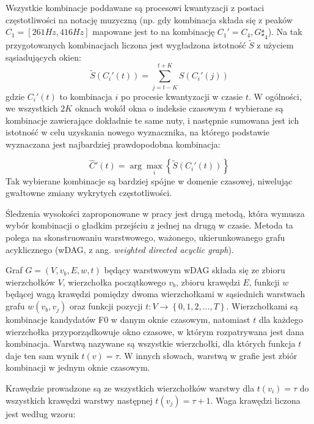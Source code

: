 \documentclass[12pt,a4paper,twoside]{mwart}
\begin{document}
Wszystkie kombinacje poddawane są procesowi kwantyzacji z postaci częstotliwości na notację muzyczną (np. gdy kombinacja składa się z peaków $C_1 = [261 Hz, 416 Hz]$ mapowane jest to na kombinację $C_1' = {C_4, G\sharp_4}$). Na tak przygotowanych kombinacjach liczona jest wygładzona istotność $\widetilde{S}$ z użyciem sąsiadujących okien:
\begin{equation} \label{eq:inharmonicity2:smoothedSalience}
  \widetilde{S}(C_i'(t)) = \sum_{j = t - K}^{t+K}S(C_i'(j))
\end{equation}
gdzie $C_i'(t)$ to kombinacja $i$ po procesie kwantyzacji w czasie $t$. W ogólności, we wszystkich $2K$ oknach wokół okna o indeksie czasowym $t$ wybierane są kombinacje zawierające dokładnie te same nuty, i następnie sumowana jest ich istotność w celu uzyskania nowego wyznacznika, na którego podstawie wyznaczana jest najbardziej prawdopodobna kombinacja:

\begin{equation} \label{eq:inharmonicity2:smoothedSalience:winner}
\widehat{C}'(t) = \arg \max_i \left\{\widetilde{S}(C_i'(t))\right\}
\end{equation}
Tak wybierane kombinacje są bardziej spójne w domenie czasowej, niwelując gwałtowne zmiany wykrytych częstotliwości.

Śledzenia wysokości zaproponowane w pracy 
\cite[7-8]{Transcription:Pertus:Inharmonicity2} 
jest drugą metodą, która wymusza wybór kombinacji o gładkim przejściu z jednej na drugą w czasie. Metoda ta polega na skonstruowaniu warstwowego, ważonego, ukierunkowanego grafu acyklicznego (wDAG, z ang. \textit{weighted directed acyclic graph}).

Graf $G = \left(V, v_b, E, w, t\right)$ będący warstwowym wDAG składa się ze zbioru wierzchołków $V$, wierzchołka początkowego $v_b$, zbioru krawędzi $E$, funkcji $w$ będącej wagą krawędzi pomiędzy dwoma wierzchołkami w sąsiednich warstwach grafu $w(v_b, v_j)$ oraz funkcji pozycji $t: V \rightarrow \left\{0, 1, 2, ..., T\right\}$. Wierzchołkami są kombinacje kandydatów F0 w danym oknie czasowym, natomiast $t$ dla każdego wierzchołka przyporządkowuje okno czasowe, w którym rozpatrywana jest dana kombinacja. Warstwą nazywane są wszystkie wierzchołki, dla których funkcja $t$ daje ten sam wynik $t(v) = \tau$. W innych słowach, warstwą w grafie jest zbiór kombinacji w jednym oknie czasowym.

Krawędzie prowadzone są ze wszystkich wierzchołków warstwy dla $t(v_i) = \tau$ do wszystkich krawędzi warstwy następnej $t(v_j) = \tau + 1$. Waga krawędzi liczona jest według wzoru:
\end{document}
